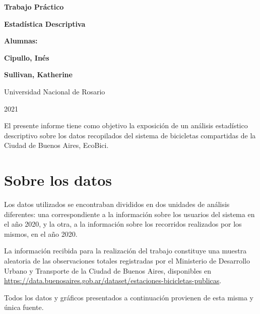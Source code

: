 \documentclass[11pt]{article}
\begin{document}
\begin{titlepage}
    \begin{center}
        \vfill
        \vfill
            \vspace{0.7cm}
            \noindent\textbf{\Huge Trabajo Pr\'actico}\par
            \noindent\textbf{\Huge Estad\'istica Descriptiva}\par
            \vspace{.5cm}
        \vfill
        \noindent \textbf{\huge Alumnas:}\par
        \vspace{.5cm}
        \noindent \textbf{\Large Cipullo, In\'es}\par
        \noindent \textbf{\Large Sullivan, Katherine}\par
 
        \vfill
        \large Universidad Nacional de Rosario \par
        \noindent\large 2021
    \end{center}
\end{titlepage}
\par

El presente informe tiene como objetivo la exposici\'on de un an\'alisis estad\'istico descriptivo
sobre los datos recopilados del sistema de bicicletas compartidas de la Ciudad de Buenos Aires, EcoBici.

\section{Sobre los datos}
Los datos utilizados se encontraban divididos en dos unidades de an\'alisis diferentes: una correspondiente
a la informaci\'on sobre los usuarios del sistema en el a\~{n}o 2020, y la otra, a la informaci\'on sobre los recorridos 
realizados por los mismos, en el a\~{n}o 2020.
\par
La informaci\'on recibida para la realizaci\'on del trabajo constituye una muestra aleatoria 
de las observaciones totales registradas por el Ministerio de Desarrollo Urbano y Transporte de la
Ciudad de Buenos Aires, disponibles en {\small \url{https://data.buenosaires.gob.ar/dataset/estaciones-bicicletas-publicas}}.
\par
Todos los datos y gr\'aficos presentados a continuaci\'on provienen de esta misma y \'unica fuente.
\end{document}
